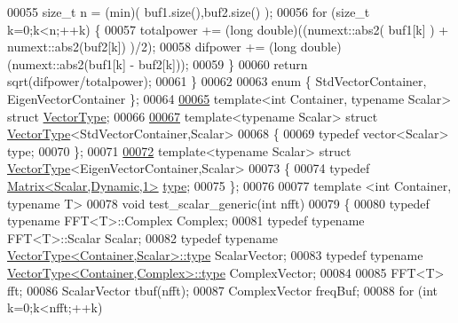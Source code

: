 \begin{DoxyCode}
00055         \textcolor{keywordtype}{size\_t} n = (min)( buf1.size(),buf2.size() );
00056         \textcolor{keywordflow}{for} (\textcolor{keywordtype}{size\_t} k=0;k<n;++k) \{
00057             totalpower += (\textcolor{keywordtype}{long} double)((numext::abs2( buf1[k] ) + numext::abs2(buf2[k]) )/2);
00058             difpower += (\textcolor{keywordtype}{long} double)(numext::abs2(buf1[k] - buf2[k]));
00059         \}
00060         \textcolor{keywordflow}{return} sqrt(difpower/totalpower);
00061     \}
00062 
00063 \textcolor{keyword}{enum} \{ StdVectorContainer, EigenVectorContainer \};
00064 
\hyperlink{struct_vector_type}{00065} \textcolor{keyword}{template}<\textcolor{keywordtype}{int} Container, \textcolor{keyword}{typename} Scalar> \textcolor{keyword}{struct }\hyperlink{struct_vector_type}{VectorType};
00066 
\hyperlink{struct_vector_type_3_01_std_vector_container_00_01_scalar_01_4}{00067} \textcolor{keyword}{template}<\textcolor{keyword}{typename} Scalar> \textcolor{keyword}{struct }\hyperlink{struct_vector_type}{VectorType}<StdVectorContainer,Scalar>
00068 \{
00069   \textcolor{keyword}{typedef} vector<Scalar> type;
00070 \};
00071 
\hyperlink{struct_vector_type_3_01_eigen_vector_container_00_01_scalar_01_4}{00072} \textcolor{keyword}{template}<\textcolor{keyword}{typename} Scalar> \textcolor{keyword}{struct }\hyperlink{struct_vector_type}{VectorType}<EigenVectorContainer,Scalar>
00073 \{
00074   \textcolor{keyword}{typedef} \hyperlink{group___core___module}{Matrix<Scalar,Dynamic,1>} \hyperlink{group___core___module}{type};
00075 \};
00076 
00077 \textcolor{keyword}{template} <\textcolor{keywordtype}{int} Container, \textcolor{keyword}{typename} T>
00078 \textcolor{keywordtype}{void} test\_scalar\_generic(\textcolor{keywordtype}{int} nfft)
00079 \{
00080     \textcolor{keyword}{typedef} \textcolor{keyword}{typename} FFT<T>::Complex Complex;
00081     \textcolor{keyword}{typedef} \textcolor{keyword}{typename} FFT<T>::Scalar Scalar;
00082     \textcolor{keyword}{typedef} \textcolor{keyword}{typename} \hyperlink{struct_vector_type}{VectorType<Container,Scalar>::type} ScalarVector;
00083     \textcolor{keyword}{typedef} \textcolor{keyword}{typename} \hyperlink{struct_vector_type}{VectorType<Container,Complex>::type} ComplexVector;
00084 
00085     FFT<T> fft;
00086     ScalarVector tbuf(nfft);
00087     ComplexVector freqBuf;
00088     \textcolor{keywordflow}{for} (\textcolor{keywordtype}{int} k=0;k<nfft;++k)

\end{DoxyCode}
